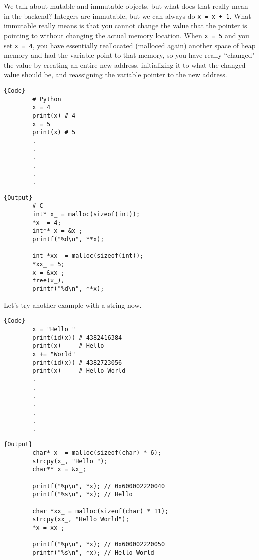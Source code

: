 \documentclass{article}
\begin{document}
      We talk about mutable and immutable objects, but what does that really mean in the backend? Integers are immutable, but we can always do \texttt{x = x + 1}. What immutable really means is that you cannot change the value that the pointer is pointing to without changing the actual memory location. When \texttt{x = 5} and you set \texttt{x = 4}, you have essentially reallocated (malloced again) another space of heap memory and had the variable point to that memory, so you have really ``changed" the value by creating an entire new address, initializing it to what the changed value should be, and reassigning the variable pointer to the new address. 

      \noindent\begin{minipage}{.5\textwidth}
      \begin{lstlisting}[]{Code}
        # Python 
        x = 4 
        print(x) # 4
        x = 5
        print(x) # 5
        .
        .
        .
        .
        .
        .
      \end{lstlisting}
      \end{minipage}
      \hfill
      \begin{minipage}{.49\textwidth}
      \begin{lstlisting}[]{Output}
        # C
        int* x_ = malloc(sizeof(int)); 
        *x_ = 4; 
        int** x = &x_; 
        printf("%d\n", **x); 

        int *xx_ = malloc(sizeof(int)); 
        *xx_ = 5; 
        x = &xx_; 
        free(x_); 
        printf("%d\n", **x); 
      \end{lstlisting}
      \end{minipage}

      Let's try another example with a string now. 

      \noindent\begin{minipage}{.5\textwidth}
      \begin{lstlisting}[]{Code}
        x = "Hello " 
        print(id(x)) # 4382416384
        print(x)     # Hello
        x += "World"
        print(id(x)) # 4382723056
        print(x)     # Hello World
        .
        .
        .
        .
        .
        .
        .
      \end{lstlisting}
      \end{minipage}
      \hfill
      \begin{minipage}{.49\textwidth}
      \begin{lstlisting}[]{Output}
        char* x_ = malloc(sizeof(char) * 6); 
        strcpy(x_, "Hello "); 
        char** x = &x_; 

        printf("%p\n", *x); // 0x600002220040
        printf("%s\n", *x); // Hello 

        char *xx_ = malloc(sizeof(char) * 11); 
        strcpy(xx_, "Hello World"); 
        *x = xx_; 

        printf("%p\n", *x); // 0x600002220050
        printf("%s\n", *x); // Hello World 
      \end{lstlisting}
      \end{minipage}
\end{document}
